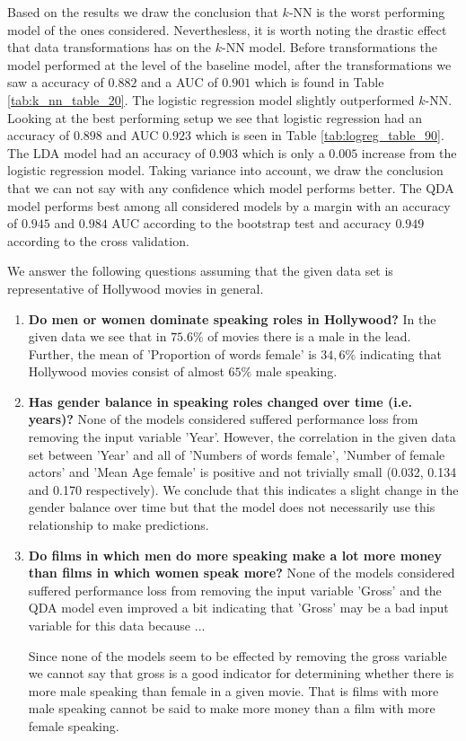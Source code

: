 \documentclass[../../project.tex]{subfiles}
\begin{document}
	Based on the results we draw the conclusion that $k$-NN is the worst performing model of the ones considered. Neverthesless, it is worth noting the drastic effect that data transformations has on the $k$-NN model. Before transformations the model performed at the level of the baseline model, after the transformations we saw a accuracy of $0.882$ and a AUC of $0.901$ which is found in Table \ref{tab:k_nn_table_20}. The logistic regression model slightly outperformed $k$-NN. Looking at the best performing setup we see that logistic regression had an accuracy of $0.898$ and AUC $0.923$ which is seen in Table \ref{tab:logreg_table_90}. The LDA model had an accuracy of $0.903$ which is only a $0.005$ increase from the logistic regression model. Taking variance into account, we draw the conclusion that we can not say with any confidence which model performs better. The QDA model performs best among all considered models by a margin with an accuracy of $0.945$ and $0.984$ AUC according to the bootstrap test and accuracy $0.949$ according to the cross validation.
	
	We answer the following questions assuming that the given data set is representative of Hollywood movies in general.
\begin{enumerate}
    \item \textbf{Do men or women dominate speaking roles in Hollywood?} In the given data we see that in $75.6\%$ of movies there is a male in the lead. Further, the mean of 'Proportion of words female' is $34,6\%$ indicating that Hollywood movies consist of almost $65\%$ male speaking.
    
    \item \textbf{Has gender balance in speaking roles changed over time (i.e. years)?} None of the models considered suffered performance loss from removing the input variable 'Year'. However, the correlation in the given data set between 'Year' and all of 'Numbers of words female', 'Number of female actors' and 'Mean Age female' is positive and not trivially small (0.032, 0.134 and 0.170 respectively). We conclude that this indicates a slight change in the gender balance over time but that the model does not necessarily use this relationship to make predictions.
   
    \item \textbf{Do films in which men do more speaking make a lot more money than films in which women speak more?} None of the models considered suffered performance loss from removing the input variable 'Gross' and the QDA model even improved a bit indicating that 'Gross' may be a bad input variable for this data because ...
    
    Since none of the models seem to be effected by removing the gross variable we cannot say that gross is a good indicator for determining whether there is more male speaking than female in a given movie. That is films with more male speaking cannot be said to make more money than a film with more female speaking. 
    
    
\end{enumerate}
	
	
	
	
\end{document}
